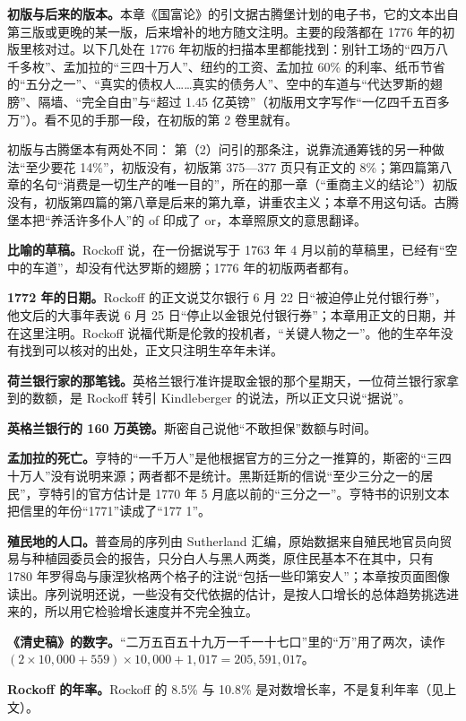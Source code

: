 \begin{deeper}[版本与史料的出入]
\textbf{初版与后来的版本。}本章《国富论》的引文据古腾堡计划的电子书，它的文本出自第三版或更晚的某一版，后来增补的地方随文注明。主要的段落都在 1776 年的初版里核对过。以下几处在 1776 年初版的扫描本里都能找到：别针工场的“四万八千多枚”、孟加拉的“三四十万人”、纽约的工资、孟加拉 60\% 的利率、纸币节省的“五分之一”、“真实的债权人……真实的债务人”、空中的车道与“代达罗斯的翅膀”、隔墙、“完全自由”与“超过 1.45 亿英镑”（初版用文字写作“一亿四千五百多万”）\cite{smith1776}。看不见的手那一段，在初版的第 2 卷里就有\cite{smith1776}。

初版与古腾堡本有两处不同： 第（2）问引的那条注，说靠流通筹钱的另一种做法“至少要花 14\%”，初版没有，初版第 375—377 页只有正文的 8\%；第四篇第八章的名句“消费是一切生产的唯一目的”，所在的那一章（“重商主义的结论”）初版没有，初版第四篇的第八章是后来的第九章，讲重农主义\cite{smith1776}；本章不用这句话。古腾堡本把“养活许多仆人”的 of 印成了 or，本章照原文的意思翻译。

\textbf{比喻的草稿。}Rockoff 说，在一份据说写于 1763 年 4 月以前的草稿里，已经有“空中的车道”，却没有代达罗斯的翅膀；1776 年的初版两者都有\cite{rockoff2009,smith1776}。

\textbf{1772 年的日期。}Rockoff 的正文说艾尔银行 6 月 22 日“被迫停止兑付银行券”，他文后的大事年表说 6 月 25 日“停止以金银兑付银行券”；本章用正文的日期，并在这里注明。Rockoff 说福代斯是伦敦的投机者，“关键人物之一”\cite{rockoff2009}。他的生卒年没有找到可以核对的出处，正文只注明生卒年未详。

\textbf{荷兰银行家的那笔钱。}英格兰银行准许提取金银的那个星期天，一位荷兰银行家拿到的数额，是 Rockoff 转引 Kindleberger 的说法，所以正文只说“据说”。

\textbf{英格兰银行的 160 万英镑。}斯密自己说他“不敢担保”数额与时间。

\textbf{孟加拉的死亡。}亨特的“一千万人”是他根据官方的三分之一推算的，斯密的“三四十万人”没有说明来源；两者都不是统计。黑斯廷斯的信说“至少三分之一的居民”，亨特引的官方估计是 1770 年 5 月底以前的“三分之一”。亨特书的识别文本把信里的年份“1771”读成了“177 1”。

\textbf{殖民地的人口。}普查局的序列由 Sutherland 汇编，原始数据来自殖民地官员向贸易与种植园委员会的报告，只分白人与黑人两类，原住民基本不在其中，只有 1780 年罗得岛与康涅狄格两个格子的注说“包括一些印第安人”；本章按页面图像读出\cite{census1975}。序列说明还说，一些没有交代依据的估计，是按人口增长的总体趋势挑选进来的，所以用它检验增长速度并不完全独立。

\textbf{《清史稿》的数字。}“二万五百五十九万一千一十七口”里的“万”用了两次，读作 $(2\times10{,}000+559)\times10{,}000+1{,}017=205{,}591{,}017$。

\textbf{Rockoff 的年率。}Rockoff 的 8.5\% 与 10.8\% 是对数增长率，不是复利年率（见上文）。
\end{deeper}


